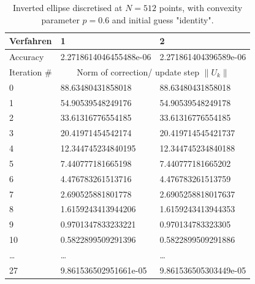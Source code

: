 \begin{table}[H] \centering
    \caption{Inverted ellipse discretised at $N = 512$ points, with convexity parameter $p = 0.6$ and initial guess "identity".}
    \begin{tabular}{|p{}|p{}|p{}|}
        \hline
        Verfahren & 1 & 2 \\
        \hline
        Accuracy & 2.2718614046455488e-06 & 2.271861404396589e-06 \\
        \hline
        Iteration \# & \multicolumn{2}{c|}{Norm of correction/ update step $\lVert U_{k} \rVert$} \\
        \hline
        0 & 88.63480431858018 & 88.63480431858018 \\
        1 & 54.90539548249176 & 54.90539548249178 \\
        2 & 33.61316776554185 & 33.61316776554185 \\
        3 & 20.41971454542174 & 20.419714545421737 \\
        4 & 12.344745234840195 & 12.344745234840188 \\
        5 & 7.440777181665198 & 7.440777181665202 \\
        6 & 4.476783261513716 & 4.476783261513759 \\
        7 & 2.690525881801778 & 2.6905258818017637 \\
        8 & 1.6159243413944206 & 1.6159243413944353 \\
        9 & 0.9701347833233221 & 0.970134783323305 \\
        10 & 0.5822899509291396 & 0.5822899509291886 \\
        \dots & \dots & \dots \\
        27 & 9.861536502951661e-05 & 9.861536505303449e-05 \\
        \hline
    \end{tabular}
\end{table}



